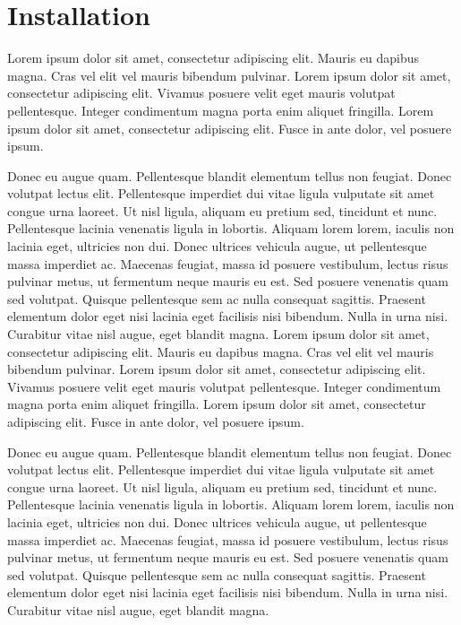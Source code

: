 \chapter{Installation}
Lorem ipsum dolor sit amet, consectetur adipiscing elit. Mauris eu dapibus magna. Cras vel elit vel mauris bibendum pulvinar. Lorem ipsum dolor sit amet, consectetur adipiscing elit. Vivamus posuere velit eget mauris volutpat pellentesque. Integer condimentum magna porta enim aliquet fringilla. Lorem ipsum dolor sit amet, consectetur adipiscing elit. Fusce in ante dolor, vel posuere ipsum.

Donec eu augue quam. Pellentesque blandit elementum tellus non feugiat. Donec volutpat lectus elit. Pellentesque imperdiet dui vitae ligula vulputate sit amet congue urna laoreet. Ut nisl ligula, aliquam eu pretium sed, tincidunt et nunc. Pellentesque lacinia venenatis ligula in lobortis. Aliquam lorem lorem, iaculis non lacinia eget, ultricies non dui. Donec ultrices vehicula augue, ut pellentesque massa imperdiet ac. Maecenas feugiat, massa id posuere vestibulum, lectus risus pulvinar metus, ut fermentum neque mauris eu est. Sed posuere venenatis quam sed volutpat. Quisque pellentesque sem ac nulla consequat sagittis. Praesent elementum dolor eget nisi lacinia eget facilisis nisi bibendum. Nulla in urna nisi. Curabitur vitae nisl augue, eget blandit magna. 
Lorem ipsum dolor sit amet, consectetur adipiscing elit. Mauris eu dapibus magna. Cras vel elit vel mauris bibendum pulvinar. Lorem ipsum dolor sit amet, consectetur adipiscing elit. Vivamus posuere velit eget mauris volutpat pellentesque. Integer condimentum magna porta enim aliquet fringilla. Lorem ipsum dolor sit amet, consectetur adipiscing elit. Fusce in ante dolor, vel posuere ipsum.

Donec eu augue quam. Pellentesque blandit elementum tellus non feugiat. Donec volutpat lectus elit. Pellentesque imperdiet dui vitae ligula vulputate sit amet congue urna laoreet. Ut nisl ligula, aliquam eu pretium sed, tincidunt et nunc. Pellentesque lacinia venenatis ligula in lobortis. Aliquam lorem lorem, iaculis non lacinia eget, ultricies non dui. Donec ultrices vehicula augue, ut pellentesque massa imperdiet ac. Maecenas feugiat, massa id posuere vestibulum, lectus risus pulvinar metus, ut fermentum neque mauris eu est. Sed posuere venenatis quam sed volutpat. Quisque pellentesque sem ac nulla consequat sagittis. Praesent elementum dolor eget nisi lacinia eget facilisis nisi bibendum. Nulla in urna nisi. Curabitur vitae nisl augue, eget blandit magna. 







